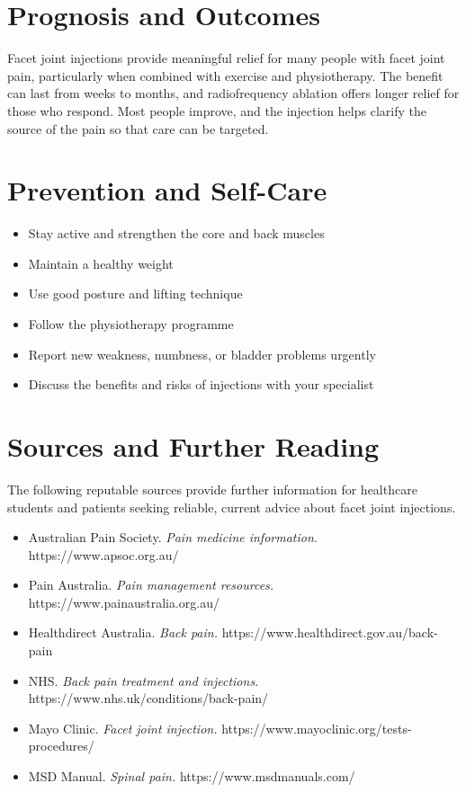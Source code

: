 \section*{Prognosis and Outcomes}
Facet joint injections provide meaningful relief for many people with facet joint pain, particularly when combined with exercise and physiotherapy. The benefit can last from weeks to months, and radiofrequency ablation offers longer relief for those who respond. Most people improve, and the injection helps clarify the source of the pain so that care can be targeted.

\section*{Prevention and Self-Care}
\begin{itemize}
    \item Stay active and strengthen the core and back muscles
    \item Maintain a healthy weight
    \item Use good posture and lifting technique
    \item Follow the physiotherapy programme
    \item Report new weakness, numbness, or bladder problems urgently
    \item Discuss the benefits and risks of injections with your specialist
\end{itemize}

\section*{Sources and Further Reading}
The following reputable sources provide further information for healthcare students and patients seeking reliable, current advice about facet joint injections.
\begin{itemize}
    \item Australian Pain Society. \textit{Pain medicine information.} https://www.apsoc.org.au/
    \item Pain Australia. \textit{Pain management resources.} https://www.painaustralia.org.au/
    \item Healthdirect Australia. \textit{Back pain.} https://www.healthdirect.gov.au/back-pain
    \item NHS. \textit{Back pain treatment and injections.} https://www.nhs.uk/conditions/back-pain/
    \item Mayo Clinic. \textit{Facet joint injection.} https://www.mayoclinic.org/tests-procedures/
    \item MSD Manual. \textit{Spinal pain.} https://www.msdmanuals.com/
\end{itemize}
